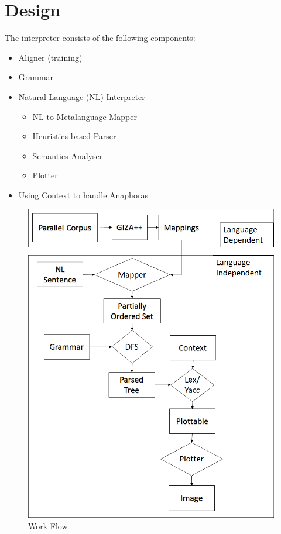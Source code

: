\def\DevnagVersion{2.15}\documentclass[12pt]{article}
\begin{document}
\section{Design}
The interpreter consists of the following components:
\begin{itemize}
\item Aligner (training)
\item Grammar
\item Natural Language (NL) Interpreter
  \begin{itemize}
    \item NL to Metalanguage Mapper
    \item Heuristics-based Parser
    \item Semantics Analyser
    \item Plotter  
  \end{itemize}
\item Using Context to handle Anaphoras
\end{itemize}

\begin{figure}[H]
  \begin{center}
    \includegraphics[scale=0.5]{workflow.png}
  \end{center}
  \caption{Work Flow}
  \label{}
\end{figure}
\end{document}
